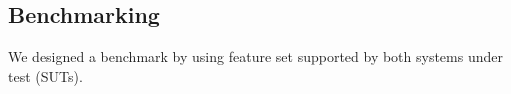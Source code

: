 \subsection{Benchmarking}


We designed a benchmark by using feature set supported by both systems under test (SUTs).
